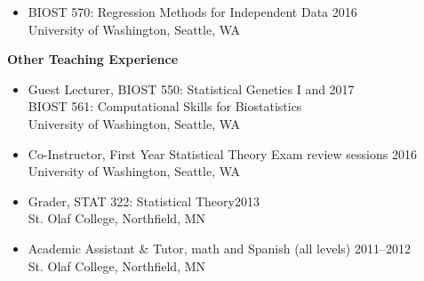 \documentclass[margin]{res}
\begin{document}
\begin{resume}
\begin{itemize}
\item BIOST 570: Regression Methods for Independent Data \hfill  2016 \\
University of Washington, Seattle, WA \vspace{0.1cm} \\

\end{itemize}




\textbf{Other Teaching Experience} \vspace{0.1cm}
\begin{itemize}
\item Guest Lecturer, BIOST 550: Statistical Genetics I and \hfill 2017 \\ BIOST 561: Computational Skills for Biostatistics \\
University of Washington, Seattle, WA\vspace{0.1cm}

\item Co-Instructor, First Year Statistical Theory Exam review sessions \hfill 2016 \\
University of Washington, Seattle, WA \vspace{0.1cm}

\item Grader, STAT 322: Statistical Theory\hfill  2013 \\
St. Olaf College, Northfield, MN \vspace{0.1cm}

\item Academic Assistant \& Tutor, math and Spanish (all levels) \hfill 2011--2012 \\
St. Olaf College, Northfield, MN \vspace{0.1cm}


\end{itemize}
\end{resume}
\end{document}
